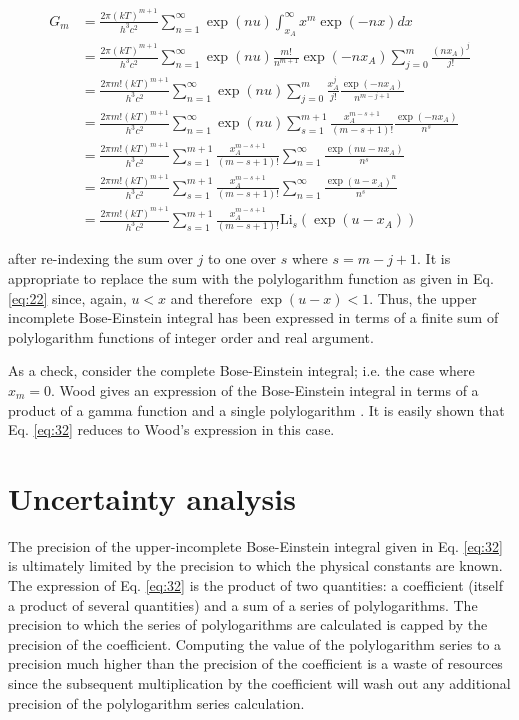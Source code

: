 \documentclass[letterpaper,12pt]{article}
\newcommand{\Li}{\textrm{Li}}
\begin{document}
\begin{align} \label{eq:32}
G_{m} &= \frac{2\pi (kT)^{m+1}}{h^{3} c^{2}} \sum_{n = 1}^{\infty} \exp(nu) \int_{x_{A}}^{\infty} x^{m} \exp(-nx) dx \nonumber \\
 &= \frac{2\pi (kT)^{m+1}}{h^{3} c^{2}} \sum_{n = 1}^{\infty} \exp(nu) \frac{m!}{n^{m+1}} \exp(-n x_{A}) \sum_{j = 0}^{m} \frac{(n x_{A})^{j}}{j!} \nonumber \\
 &= \frac{2\pi m! (kT)^{m+1}}{h^{3} c^{2}} \sum_{n = 1}^{\infty} \exp(nu) \sum_{j = 0}^{m} \frac{x_{A}^{j}}{j!} \frac{\exp(-n x_{A})}{n^{m-j+1}} \nonumber \\
 &= \frac{2\pi m! (kT)^{m+1}}{h^{3} c^{2}} \sum_{n = 1}^{\infty} \exp(nu) \sum_{s = 1}^{m+1} \frac{x_{A}^{m-s+1}}{(m-s+1)!} \frac{\exp(-n x_{A})}{n^{s}} \nonumber \\
 &= \frac{2\pi m! (kT)^{m+1}}{h^{3} c^{2}} \sum_{s = 1}^{m+1} \frac{x_{A}^{m-s+1}}{(m-s+1)!} \sum_{n = 1}^{\infty} \frac{\exp(nu-n x_{A})}{n^{s}} \nonumber \\
 &= \frac{2\pi m! (kT)^{m+1}}{h^{3} c^{2}} \sum_{s = 1}^{m+1} \frac{x_{A}^{m-s+1}}{(m-s+1)!} \sum_{n = 1}^{\infty} \frac{\exp(u-x_{A})^{n}}{n^{s}} \nonumber \\
 &= \frac{2\pi m! (kT)^{m+1}}{h^{3} c^{2}} \sum_{s = 1}^{m+1} \frac{x_{A}^{m-s+1}}{(m-s+1)!} \Li_{s} \left( \exp(u-x_{A}) \right)
\end{align}

\noindent after re-indexing the sum over $j$ to one over $s$ where $s = m - j + 1$. It is appropriate to replace the sum with the polylogarithm function as given in Eq. \ref{eq:22} since, again, $u < x$ and therefore $\exp(u-x) < 1$. Thus, the upper incomplete Bose-Einstein integral has been expressed in terms of a finite sum of polylogarithm functions of integer order and real argument.

As a check, consider the complete Bose-Einstein integral; i.e. the case where $x_{m} = 0$. Wood gives an expression of the Bose-Einstein integral in terms of a product of a gamma function and a single polylogarithm \cite{60067317}. It is easily shown that Eq. \ref{eq:32} reduces to Wood's expression in this case.


\section{Uncertainty analysis}
The precision of the upper-incomplete Bose-Einstein integral given in Eq. \ref{eq:32} is ultimately limited by the precision to which the physical constants are known. The expression of Eq. \ref{eq:32} is the product of two quantities: a coefficient (itself a product of several quantities) and a sum of a series of polylogarithms. The precision to which the series of polylogarithms are calculated is capped by the precision of the coefficient. Computing the value of the polylogarithm series to a precision much higher than the precision of the coefficient is a waste of resources since the subsequent multiplication by the coefficient will wash out any additional precision of the polylogarithm series calculation.
\end{document}
